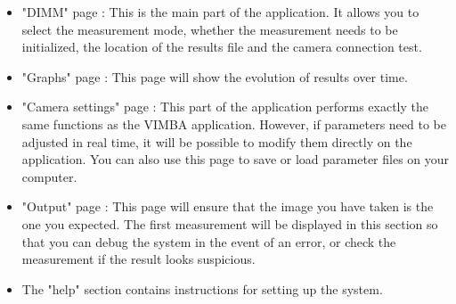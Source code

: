 \begin{itemize}
    \item "\Gls{DIMM}" page : This is the main part of the application. It allows you to select the measurement mode,
          whether the measurement needs to be initialized, the location of the results file and the camera connection test.
    \item "Graphs" page : This page will show the evolution of results over time.
    \item "Camera settings" page : This part of the application performs exactly the same functions as the VIMBA application.
          However, if parameters need to be adjusted in real time, it will be possible to modify them directly on the application.
          You can also use this page to save or load parameter files on your computer.
    \item "Output" page : This page will ensure that the image you have taken is the one you expected.
          The first measurement will be displayed in this section so that you can debug the system in the event of an error,
          or check the measurement if the result looks suspicious.
    \item The "help" section contains instructions for setting up the system.
\end{itemize}